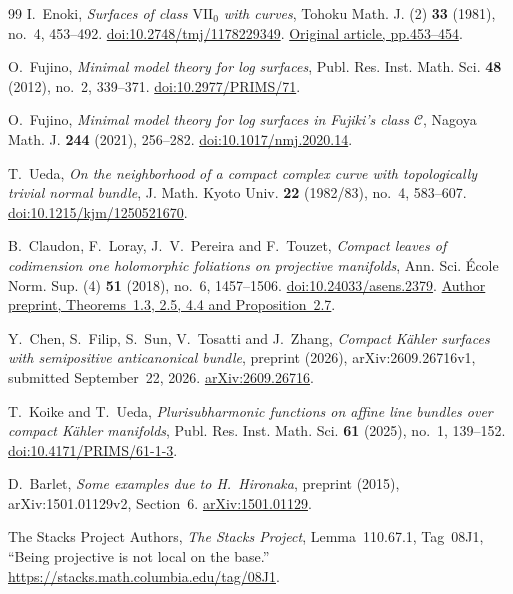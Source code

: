 \documentclass[11pt]{amsart}
\theoremstyle{definition}
\theoremstyle{remark}
\numberwithin{equation}{section}
\begin{document}
\begin{thebibliography}{99}
I.~Enoki, \emph{Surfaces of class $\mathrm{VII}_0$ with curves}, Tohoku Math. J. (2)
\textbf{33} (1981), no.~4, 453--492.
\href{https://doi.org/10.2748/tmj/1178229349}{doi:10.2748/tmj/1178229349}.
\href{https://www.jstage.jst.go.jp/article/tmj1949/33/4/33_4_453/_pdf/-char/en}{Original article, pp.453--454}.

O.~Fujino,
\emph{Minimal model theory for log surfaces},
Publ. Res. Inst. Math. Sci. \textbf{48} (2012), no.~2, 339--371.
\href{https://doi.org/10.2977/PRIMS/71}{doi:10.2977/PRIMS/71}.

O.~Fujino,
\emph{Minimal model theory for log surfaces in Fujiki's class $\mathcal C$},
Nagoya Math. J. \textbf{244} (2021), 256--282.
\href{https://doi.org/10.1017/nmj.2020.14}{doi:10.1017/nmj.2020.14}.

T.~Ueda,
\emph{On the neighborhood of a compact complex curve with topologically
trivial normal bundle},
J. Math. Kyoto Univ. \textbf{22} (1982/83), no.~4, 583--607.
\href{https://doi.org/10.1215/kjm/1250521670}{doi:10.1215/kjm/1250521670}.

B.~Claudon, F.~Loray, J.~V.~Pereira and F.~Touzet,
\emph{Compact leaves of codimension one holomorphic foliations on
projective manifolds},
Ann. Sci. \'Ecole Norm. Sup. (4) \textbf{51} (2018), no.~6, 1457--1506.
\href{https://doi.org/10.24033/asens.2379}{doi:10.24033/asens.2379}.
\href{https://arxiv.org/abs/1512.06623}{Author preprint, Theorems~1.3, 2.5, 4.4 and Proposition~2.7}.

Y.~Chen, S.~Filip, S.~Sun, V.~Tosatti and J.~Zhang,
\emph{Compact K\"ahler surfaces with semipositive anticanonical bundle},
preprint (2026), arXiv:2609.26716v1, submitted September~22, 2026.
\href{https://arxiv.org/abs/2609.26716v1}{arXiv:2609.26716}.

T.~Koike and T.~Ueda,
\emph{Plurisubharmonic functions on affine line bundles over compact
K\"ahler manifolds},
Publ. Res. Inst. Math. Sci. \textbf{61} (2025), no.~1, 139--152.
\href{https://doi.org/10.4171/PRIMS/61-1-3}{doi:10.4171/PRIMS/61-1-3}.

D.~Barlet,
\emph{Some examples due to H.~Hironaka},
preprint (2015), arXiv:1501.01129v2, Section~6.
\href{https://arxiv.org/abs/1501.01129}{arXiv:1501.01129}.

The Stacks Project Authors,
\emph{The Stacks Project},
Lemma~110.67.1, Tag~08J1, ``Being projective is not local on the base.''
\url{https://stacks.math.columbia.edu/tag/08J1}.

\end{thebibliography}
\end{document}
